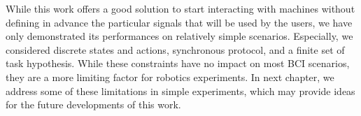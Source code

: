 While this work offers a good solution to start interacting with machines without defining in advance the particular signals that will be used by the users, we have only demonstrated its performances on relatively simple scenarios. Especially, we considered discrete states and actions, synchronous protocol, and a finite set of task hypothesis. While these constraints have no impact on most BCI scenarios, they are a more limiting factor for robotics experiments. In next chapter, we address some of these limitations in simple experiments, which may provide ideas for the future developments of this work.


















